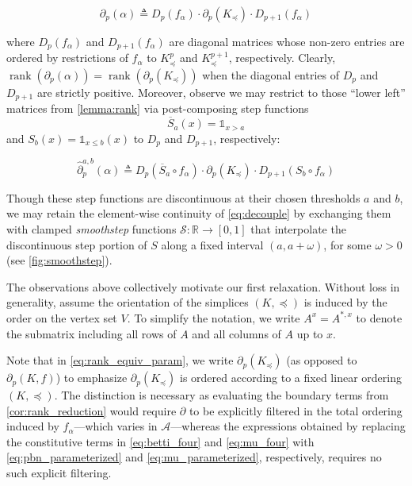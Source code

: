 \documentclass[pdflatex,sn-mathphys-num]{sn-jnl}
\begin{document}
\[\partial_{p}(\alpha) \triangleq D_{p}\left( f_{\alpha} \right) \cdot \partial_{p} \left( K_{\preceq} \right)  \cdot D_{p + 1}\left( f_{\alpha} \right)\] \protect{}\label{eq:decouple}{}

where \(D_{p}\left( f_{\alpha} \right)\) and \(D_{p + 1}\left( f_{\alpha} \right)\) are diagonal matrices whose non-zero entries are ordered by restrictions of \(f_{\alpha}\) to \(K_{\preceq}^{p}\) and \(K_{\preceq}^{p + 1}\), respectively. Clearly, \(\operatorname{rank}\left( \partial_{p}(\alpha) \right) = \operatorname{rank} \left( \partial_{p} \left( K_{\preceq} \right)  \right) \) when the diagonal entries of \(D_{p}\) and \(D_{p + 1}\) are strictly positive. Moreover, observe we may restrict to those ``lower left'' matrices from \ref{lemma:rank} via post-composing step functions \[{\overline{S}}_{a}(x) = \mathbb{1}_{x > a}\] and \(S_{b}(x) = \mathbb{1}_{x \leq b}(x)\) to \(D_{p}\) and \(D_{p + 1}\), respectively:

\[{\hat{\partial}}_{p}^{a,b}(\alpha) \triangleq D_{p}\left( {\overline{S}}_{a} \circ f_{\alpha} \right) \cdot \partial_{p} \left( K_{\preceq} \right)  \cdot D_{p + 1}\left( S_{b} \circ f_{\alpha} \right)\] \protect{}\label{eq:rank_equiv_param}{}

Though these step functions are discontinuous at their chosen thresholds \(a\) and \(b\), we may retain the element-wise continuity of \ref{eq:decouple} by exchanging them with clamped \emph{smoothstep} functions \(\mathcal{S}:\mathbb{R} \rightarrow  [ 0,1] \) that interpolate the discontinuous step portion of \(S\) along a fixed interval \((a,a + \omega)\), for some \(\omega > 0\) (see \ref{fig:smoothstep}).

The observations above collectively motivate our first relaxation. Without loss in generality, assume the orientation of the simplices \( (K, \preceq ) \) is induced by the order on the vertex set \(V\). To simplify the notation, we write \(A^{x} = A^{\ast ,x}\) to denote the submatrix including all rows of \(A\) and all columns of \(A\) up to \(x\).

Note that in \ref{eq:rank_equiv_param}, we write \(\partial_{p} \left( K_{\preceq} \right) \) (as opposed to \(\partial_{p}(K,f)\)) to emphasize \(\partial_{p} \left( K_{\preceq} \right) \) is ordered according to a fixed linear ordering \( (K, \preceq ) \). The distinction is necessary as evaluating the boundary terms from \ref{cor:rank_reduction} would require \(\partial\) to be explicitly filtered in the total ordering induced by \(f_{\alpha}\)---which varies in \(\mathcal{A}\)---whereas the expressions obtained by replacing the constitutive terms in \ref{eq:betti_four} and \ref{eq:mu_four} with \ref{eq:pbn_parameterized} and \ref{eq:mu_parameterized}, respectively, requires no such explicit filtering.
\end{document}
